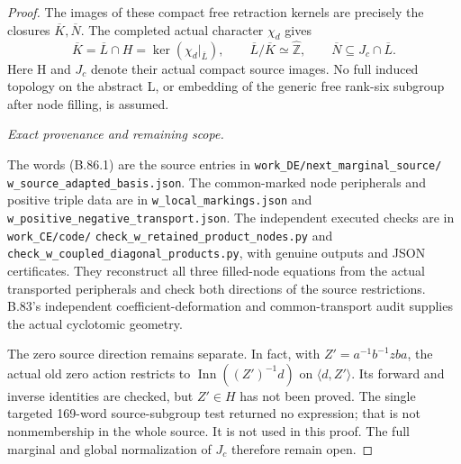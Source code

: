 \begin{proof}
The images of these compact free retraction kernels are precisely the
closures \(\overline K,\overline N\). The completed actual character
\(\chi_d\) gives
\[
 \overline K=\overline L\cap H
       =\ker(\chi_d|_{\overline L}),\qquad
 \overline L/\overline K\simeq\widehat{\mathbb Z},\qquad
 \overline N\subseteq J_c\cap\overline L .
\tag{B.86.12}
\]
Here H and \(J_c\) denote their actual compact source images.
No full induced topology on the abstract L, or embedding of the
generic free rank-six subgroup after node filling, is assumed.

\emph{Exact provenance and remaining scope.}\par
The words (B.86.1) are the source entries in
\texttt{work\_\allowbreak DE/next\_\allowbreak marginal\_\allowbreak source/}\allowbreak
\texttt{w\_\allowbreak source\_\allowbreak adapted\_\allowbreak basis.json}.
The common-marked node peripherals and positive triple data are in
\texttt{w\_\allowbreak local\_\allowbreak markings.json} and
\texttt{w\_\allowbreak positive\_\allowbreak negative\_\allowbreak transport.json}.
The independent executed checks are in
\texttt{work\_\allowbreak CE/code/}\allowbreak
\texttt{check\_\allowbreak w\_\allowbreak retained\_\allowbreak product\_\allowbreak nodes.py}
and
\texttt{check\_\allowbreak w\_\allowbreak coupled\_\allowbreak diagonal\_\allowbreak products.py},
with genuine outputs and JSON certificates. They reconstruct all three
filled-node equations from the actual transported peripherals and check
both directions of the source restrictions. B.83's independent
coefficient-deformation and common-transport audit supplies the actual
cyclotomic geometry.

The zero source direction remains separate. In fact, with
\(Z'=a^{-1}b^{-1}zba\), the actual old zero action restricts to
\(\operatorname{Inn}((Z')^{-1}d)\) on \(\langle d,Z'\rangle\).
Its forward and inverse identities are checked, but \(Z'\in H\)
has not been proved. The single targeted 169-word source-subgroup test
returned no expression; that is not nonmembership in the whole source.
It is not used in this proof. The full marginal and global
normalization of \(J_c\) therefore remain open.
\end{proof}
